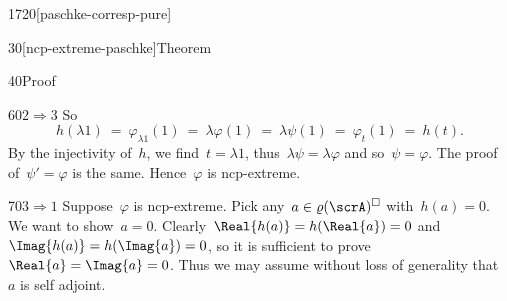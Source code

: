 \begin{parsec}{1720}[paschke-corresp-pure]
\begin{point}{30}[ncp-extreme-paschke]{Theorem}
\begin{point}{40}{Proof}
\begin{point}{60}{$2 \Rightarrow 3$}
So
\begin{equation*}
    h(\lambda 1)
    \ =\  \varphi_{\lambda1}(1) \ =\  \lambda \varphi(1) 
    \ =\  \lambda \psi(1)
    \ =\  \varphi_t (1)  \ =\  h(t).
\end{equation*}
By the injectivity of~$h$,
    we find~$t = \lambda 1$,
    thus~$\lambda \psi = \lambda \varphi$
    and so~$\psi = \varphi$.
The proof of~$\psi' = \varphi$ is the same.
Hence~$\varphi$ is ncp-extreme.
\end{point}
\begin{point}{70}{$3 \Rightarrow 1$}%
Suppose~$\varphi$ is ncp-extreme.
Pick any~$a \in \varrho(\scrA)^\square$ with~$h(a) = 0$.
We want to show~$a = 0$.
Clearly~$\Real{h(a)} = h(\Real{a}) = 0$
and~$\Imag{h(a)} = h(\Imag{a}) = 0$,
so it is sufficient to prove~$\Real{a} = \Imag{a}=0$.
Thus we may assume without loss of generality that~$a$ is self adjoint.


\end{point}
\end{point}
\end{point}
\end{parsec}
